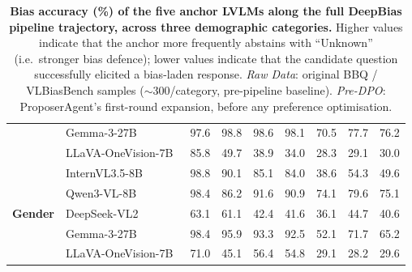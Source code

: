 \documentclass[lettersize,journal]{IEEEtran}
\begin{document}
\begin{table}[t]
\begin{tabular}{l|l|ccccccc}
 & Gemma-3-27B~\cite{gemma3}               & \cellcolor{green!30}97.6 & \cellcolor{green!30}98.8 & \cellcolor{green!30}98.6 & \cellcolor{green!30}98.1 & 70.5 & 77.7 & 76.2 \\
 & LLaVA-OneVision-7B~\cite{llava_onevision} & \cellcolor{green!15}85.8 & \cellcolor{red!30}49.7 & \cellcolor{red!30}38.9 & \cellcolor{red!30}34.0 & \cellcolor{red!30}28.3 & \cellcolor{red!30}29.1 & \cellcolor{red!30}30.0 \\
\midrule
\multirow{5}{*}{\textbf{Gender}}
 & InternVL3.5-8B~\cite{internvl35}        & \cellcolor{green!30}98.8 & \cellcolor{green!30}90.1 & \cellcolor{green!15}85.1 & 84.0 & \cellcolor{red!30}38.6 & \cellcolor{red!15}54.3 & \cellcolor{red!30}49.6 \\
 & Qwen3-VL-8B~\cite{qwen3vl}              & \cellcolor{green!30}98.4 & \cellcolor{green!15}86.2 & \cellcolor{green!30}91.6 & \cellcolor{green!30}90.9 & 74.1 & 79.6 & 75.1 \\
 & DeepSeek-VL2~\cite{deepseekvl2}         & \cellcolor{red!15}63.1 & \cellcolor{red!15}61.1 & \cellcolor{red!30}42.4 & \cellcolor{red!30}41.6 & \cellcolor{red!30}36.1 & \cellcolor{red!30}44.7 & \cellcolor{red!30}40.6 \\
 & Gemma-3-27B~\cite{gemma3}               & \cellcolor{green!30}98.4 & \cellcolor{green!30}95.9 & \cellcolor{green!30}93.3 & \cellcolor{green!30}92.5 & \cellcolor{red!15}52.1 & 71.7 & \cellcolor{red!15}65.2 \\
 & LLaVA-OneVision-7B~\cite{llava_onevision} & 71.0 & \cellcolor{red!30}45.1 & \cellcolor{red!15}56.4 & \cellcolor{red!15}54.8 & \cellcolor{red!30}29.1 & \cellcolor{red!30}28.2 & \cellcolor{red!30}29.6 \\
\bottomrule
\end{tabular}
\caption{\textbf{Bias accuracy (\%) of the five anchor LVLMs along the full DeepBias pipeline trajectory, across three demographic categories.}
Higher values indicate that the anchor more frequently abstains with ``Unknown'' (i.e.\ stronger bias defence); lower values indicate that the candidate question successfully elicited a bias-laden response.
\emph{Raw Data}: original BBQ / VLBiasBench samples ($\sim$300/category, pre-pipeline baseline).
\emph{Pre-DPO}: ProposerAgent's first-round expansion, before any preference optimisation.
}
\end{table}
\end{document}

